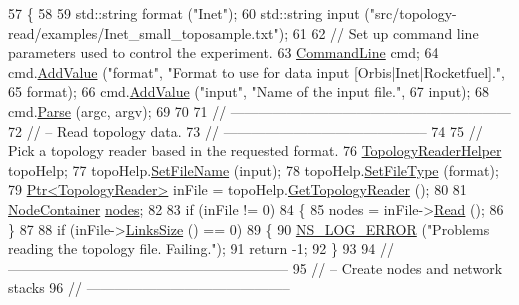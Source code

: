 \begin{DoxyCode}
57 \{
58 
59   std::string format (\textcolor{stringliteral}{"Inet"});
60   std::string input (\textcolor{stringliteral}{"src/topology-read/examples/Inet\_small\_toposample.txt"});
61 
62   \textcolor{comment}{// Set up command line parameters used to control the experiment.}
63   \hyperlink{classns3_1_1CommandLine}{CommandLine} cmd;
64   cmd.\hyperlink{classns3_1_1CommandLine_addcfb546c7ad4c8bd0965654d55beb8e}{AddValue} (\textcolor{stringliteral}{"format"}, \textcolor{stringliteral}{"Format to use for data input [Orbis|Inet|Rocketfuel]."},
65                 format);
66   cmd.\hyperlink{classns3_1_1CommandLine_addcfb546c7ad4c8bd0965654d55beb8e}{AddValue} (\textcolor{stringliteral}{"input"}, \textcolor{stringliteral}{"Name of the input file."},
67                 input);
68   cmd.\hyperlink{classns3_1_1CommandLine_a5c10b85b3207e5ecb48d907966923156}{Parse} (argc, argv);
69 
70 
71   \textcolor{comment}{// ------------------------------------------------------------}
72   \textcolor{comment}{// -- Read topology data.}
73   \textcolor{comment}{// --------------------------------------------}
74 
75   \textcolor{comment}{// Pick a topology reader based in the requested format.}
76   \hyperlink{classns3_1_1TopologyReaderHelper}{TopologyReaderHelper} topoHelp;
77   topoHelp.\hyperlink{classns3_1_1TopologyReaderHelper_aadb5ec87fde6aba01d6a1822c8d42e89}{SetFileName} (input);
78   topoHelp.\hyperlink{classns3_1_1TopologyReaderHelper_a5365b0f002b20399917d4b832a52bdb2}{SetFileType} (format);
79   \hyperlink{classns3_1_1Ptr}{Ptr<TopologyReader>} inFile = topoHelp.\hyperlink{classns3_1_1TopologyReaderHelper_aaa2058c9cdebfe726cde28bbfc1562f4}{GetTopologyReader} ();
80 
81   \hyperlink{classns3_1_1NodeContainer}{NodeContainer} \hyperlink{visualizer-ideas_8txt_a3e1b3808014a2c68ab0cd0182e041be2}{nodes};
82 
83   \textcolor{keywordflow}{if} (inFile != 0)
84     \{
85       nodes = inFile->\hyperlink{classns3_1_1TopologyReader_ae2a69c10e0bb66d6c850a72c6655e69c}{Read} ();
86     \}
87 
88   \textcolor{keywordflow}{if} (inFile->\hyperlink{classns3_1_1TopologyReader_ae610852021242bb82d7bae992a31ebb7}{LinksSize} () == 0)
89     \{
90       \hyperlink{group__logging_ga0261a8db1d4ac5f79417d117634fd455}{NS\_LOG\_ERROR} (\textcolor{stringliteral}{"Problems reading the topology file. Failing."});
91       \textcolor{keywordflow}{return} -1;
92     \}
93 
94   \textcolor{comment}{// ------------------------------------------------------------}
95   \textcolor{comment}{// -- Create nodes and network stacks}
96   \textcolor{comment}{// --------------------------------------------}

\end{DoxyCode}
